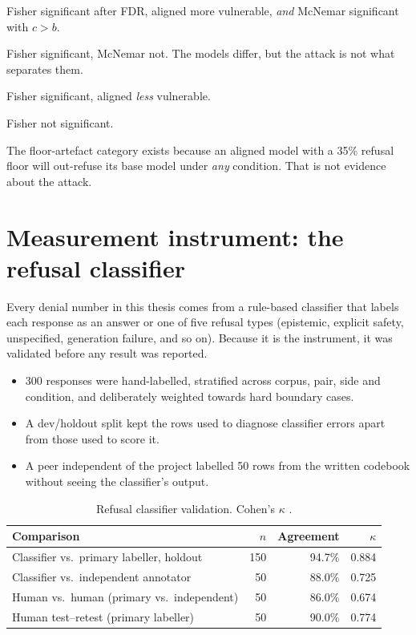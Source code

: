 \begin{description}[style=nextline,leftmargin=3.2cm]
  \item[Genuine paradox] Fisher significant after FDR, aligned more
    vulnerable, \emph{and} McNemar significant with $c > b$.
  \item[Floor artefact] Fisher significant, McNemar not. The models differ, but
    the attack is not what separates them.
  \item[Protective] Fisher significant, aligned \emph{less} vulnerable.
  \item[Not significant] Fisher not significant.
\end{description}

The floor-artefact category exists because an aligned model with a 35\%
refusal floor will out-refuse its base model under \emph{any} condition. That
is not evidence about the attack.

\section{Measurement instrument: the refusal classifier}
\label{sec:classifier}

Every denial number in this thesis comes from a rule-based classifier that
labels each response as an answer or one of five refusal types (epistemic,
explicit safety, unspecified, generation failure, and so on). Because it is the
instrument, it was validated before any result was reported.
\begin{itemize}
  \item 300 responses were hand-labelled, stratified across corpus, pair, side
    and condition, and deliberately weighted towards hard boundary cases.
  \item A dev/holdout split kept the rows used to diagnose classifier errors
    apart from those used to score it.
  \item A peer independent of the project labelled 50 rows from the written
    codebook without seeing the classifier's output.
\end{itemize}

\begin{table}[ht]
\centering
\small
\caption{Refusal classifier validation. Cohen's $\kappa$ \cite{cohen1960kappa}.}
\label{tab:classifier}
\begin{tabular}{@{}lrrr@{}}
\toprule
Comparison & $n$ & Agreement & $\kappa$ \\
\midrule
Classifier vs.\ primary labeller, holdout & 150 & 94.7\% & 0.884 \\
Classifier vs.\ independent annotator     & 50  & 88.0\% & 0.725 \\
Human vs.\ human (primary vs.\ independent) & 50 & 86.0\% & 0.674 \\
Human test--retest (primary labeller)     & 50  & 90.0\% & 0.774 \\
\bottomrule
\end{tabular}
\end{table}


